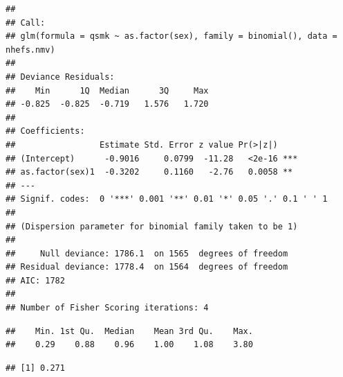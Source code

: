 \documentclass[
  10pt,
]{book}
\newenvironment{Shaded}{\begin{snugshade}}{\end{snugshade}}
\newcommand{\AttributeTok}[1]{\textcolor[rgb]{0.77,0.63,0.00}{#1}}
\newcommand{\DecValTok}[1]{\textcolor[rgb]{0.00,0.00,0.81}{#1}}
\newcommand{\FunctionTok}[1]{\textcolor[rgb]{0.00,0.00,0.00}{#1}}
\newcommand{\NormalTok}[1]{#1}
\newcommand{\OtherTok}[1]{\textcolor[rgb]{0.56,0.35,0.01}{#1}}
\newcommand{\SpecialCharTok}[1]{\textcolor[rgb]{0.00,0.00,0.00}{#1}}
\newcommand{\StringTok}[1]{\textcolor[rgb]{0.31,0.60,0.02}{#1}}
\begin{document}
\begin{verbatim}
## 
## Call:
## glm(formula = qsmk ~ as.factor(sex), family = binomial(), data = nhefs.nmv)
## 
## Deviance Residuals: 
##    Min      1Q  Median      3Q     Max  
## -0.825  -0.825  -0.719   1.576   1.720  
## 
## Coefficients:
##                 Estimate Std. Error z value Pr(>|z|)    
## (Intercept)      -0.9016     0.0799  -11.28   <2e-16 ***
## as.factor(sex)1  -0.3202     0.1160   -2.76   0.0058 ** 
## ---
## Signif. codes:  0 '***' 0.001 '**' 0.01 '*' 0.05 '.' 0.1 ' ' 1
## 
## (Dispersion parameter for binomial family taken to be 1)
## 
##     Null deviance: 1786.1  on 1565  degrees of freedom
## Residual deviance: 1778.4  on 1564  degrees of freedom
## AIC: 1782
## 
## Number of Fisher Scoring iterations: 4
\end{verbatim}

\begin{Shaded}
\end{Shaded}

\begin{verbatim}
##    Min. 1st Qu.  Median    Mean 3rd Qu.    Max. 
##    0.29    0.88    0.96    1.00    1.08    3.80
\end{verbatim}

\begin{Shaded}
\end{Shaded}

\begin{verbatim}
## [1] 0.271
\end{verbatim}
\end{document}
